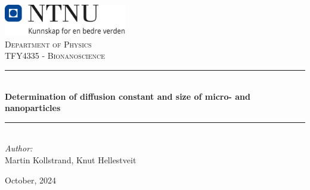 \begin{titlepage}
\vbox{ }
\vbox{ }
\begin{center}

\includegraphics[width=0.40\textwidth]{Images/NTNU_logo.png}\\[1cm]
\textsc{\LARGE Department of Physics}\\[1.5cm]
\textsc{\Large TFY4335 - Bionanoscience}\\[0.5cm]
\vbox{ }

\rule{\linewidth}{0.5mm} \\[0.4cm]
{ \huge \bfseries Determination of diffusion constant and size of micro- and nanoparticles}\\[0.4cm]
\rule{\linewidth}{0.5mm} \\[1.5cm]

\large
\emph{Author:}\\
Martin Kollstrand, Knut Hellestveit
\vfill

{\large October, 2024}

\end{center}
\end{titlepage}
